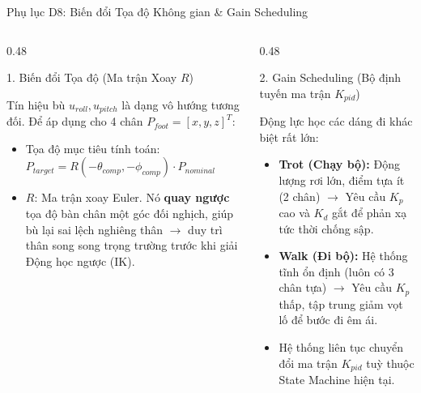 \documentclass[10pt,aspectratio=169]{beamer}
\begin{document}
\begin{frame}{Phụ lục D8: Biến đổi Tọa độ Không gian \& Gain Scheduling}
  \small
  \begin{columns}[t]
      \begin{column}{0.48\textwidth}
          \begin{block}{1. Biến đổi Tọa độ (Ma trận Xoay $R$)}
              {\footnotesize Tín hiệu bù $u_{roll}, u_{pitch}$ là dạng vô hướng tương đối. Để áp dụng cho 4 chân $P_{foot} = [x, y, z]^T$:
              \begin{itemize}
                  \item Tọa độ mục tiêu tính toán: $P_{target} = R(-\theta_{comp}, -\phi_{comp}) \cdot P_{nominal}$
                  \item $R$: Ma trận xoay Euler. Nó \textbf{quay ngược} tọa độ bàn chân một góc đối nghịch, giúp bù lại sai lệch nghiêng thân $\rightarrow$ duy trì thân song song trọng trường trước khi giải Động học ngược (IK).
              \end{itemize}}
          \end{block}
      \end{column}
      \begin{column}{0.48\textwidth}
          \begin{block}{2. Gain Scheduling (Bộ định tuyến ma trận $K_{pid}$)}
              {\footnotesize Động lực học các dáng đi khác biệt rất lớn:
              \begin{itemize}
                  \item \textbf{Trot (Chạy bộ):} Động lượng rơi lớn, điểm tựa ít (2 chân) $\rightarrow$ Yêu cầu $K_p$ cao và $K_d$ gắt để phản xạ tức thời chống sập.
                  \item \textbf{Walk (Đi bộ):} Hệ thống tĩnh ổn định (luôn có 3 chân tựa) $\rightarrow$ Yêu cầu $K_p$ thấp, tập trung giảm vọt lố để bước đi êm ái.
                  \item Hệ thống liên tục chuyển đổi ma trận $K_{pid}$ tuỳ thuộc State Machine hiện tại.
              \end{itemize}}
          \end{block}
      \end{column}
  \end{columns}
\end{frame}
\end{document}
